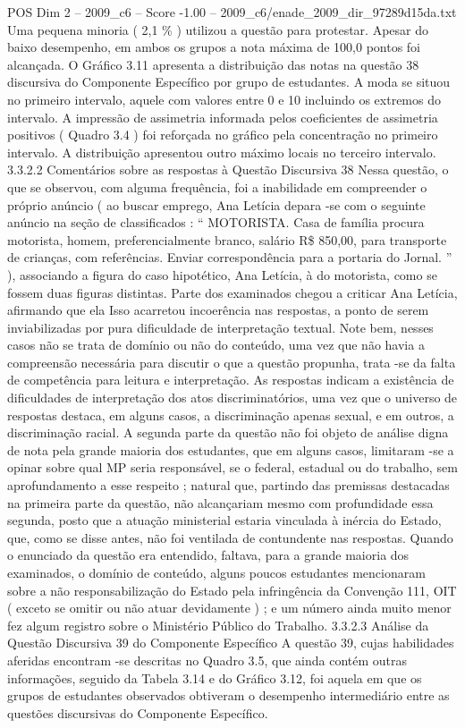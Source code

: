 \begin{textsample}{POS Dim 2 – 2009\_c6 – Score -1.00 – 2009\_c6/enade\_2009\_dir\_97289d15da.txt}
Uma pequena minoria ( 2,1 \% ) utilizou a questão para protestar.
Apesar do baixo desempenho, em ambos os grupos a nota máxima de 100,0 pontos foi alcançada.
O Gráfico 3.11 apresenta a distribuição das notas na questão 38 discursiva do Componente Específico por grupo de estudantes.
A moda se situou no primeiro intervalo, aquele com valores entre 0 e 10 incluindo os extremos do intervalo.
A impressão de assimetria informada pelos coeficientes de assimetria positivos ( Quadro 3.4 ) foi reforçada no gráfico pela concentração no primeiro intervalo.
A distribuição apresentou outro máximo locais no terceiro intervalo. 3.3.2.2 Comentários sobre as respostas à Questão Discursiva 38 Nessa questão, o que se observou, com alguma frequência, foi a inabilidade em compreender o próprio anúncio ( ao buscar emprego, Ana Letícia depara -se com o seguinte anúncio na seção de classificados : “ MOTORISTA.
Casa de família procura motorista, homem, preferencialmente branco, salário R\$ 850,00, para transporte de crianças, com referências.
Enviar correspondência para a portaria do Jornal. ” ), associando a figura do caso hipotético, Ana Letícia, à do motorista, como se fossem duas figuras distintas.
Parte dos examinados chegou a criticar Ana Letícia, afirmando que ela Isso acarretou incoerência nas respostas, a ponto de serem inviabilizadas por pura dificuldade de interpretação textual.
Note bem, nesses casos não se trata de domínio ou não do conteúdo, uma vez que não havia a compreensão necessária para discutir o que a questão propunha, trata -se da falta de competência para leitura e interpretação.
As respostas indicam a existência de dificuldades de interpretação dos atos discriminatórios, uma vez que o universo de respostas destaca, em alguns casos, a discriminação apenas sexual, e em outros, a discriminação racial.
A segunda parte da questão não foi objeto de análise digna de nota pela grande maioria dos estudantes, que em alguns casos, limitaram -se a opinar sobre qual MP seria responsável, se o federal, estadual ou do trabalho, sem aprofundamento a esse respeito ; natural que, partindo das premissas destacadas na primeira parte da questão, não alcançariam mesmo com profundidade essa segunda, posto que a atuação ministerial estaria vinculada à inércia do Estado, que, como se disse antes, não foi ventilada de contundente nas respostas.
Quando o enunciado da questão era entendido, faltava, para a grande maioria dos examinados, o domínio de conteúdo, alguns poucos estudantes mencionaram sobre a não responsabilização do Estado pela infringência da Convenção 111, OIT ( exceto se omitir ou não atuar devidamente ) ; e um número ainda muito menor fez algum registro sobre o Ministério Público do Trabalho. 3.3.2.3 Análise da Questão Discursiva 39 do Componente Específico A questão 39, cujas habilidades aferidas encontram -se descritas no Quadro 3.5, que ainda contém outras informações, seguido da Tabela 3.14 e do Gráfico 3.12, foi aquela em que os grupos de estudantes observados obtiveram o desempenho intermediário entre as questões discursivas do Componente Específico.

\end{textsample}
